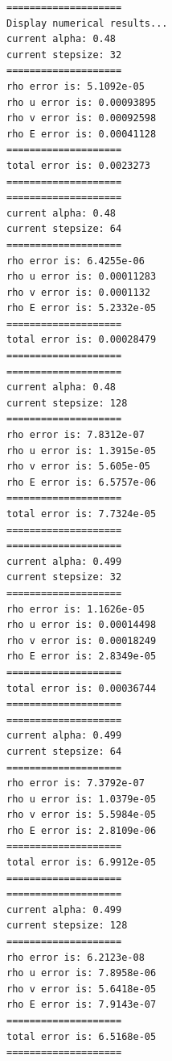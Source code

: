 \documentclass[12pt]{article}
\begin{document}
        \color{gray} 
\begin{verbatim}
====================
Display numerical results...
current alpha: 0.48
current stepsize: 32
====================
rho error is: 5.1092e-05
rho u error is: 0.00093895
rho v error is: 0.00092598
rho E error is: 0.00041128
====================
total error is: 0.0023273
====================
====================
current alpha: 0.48
current stepsize: 64
====================
rho error is: 6.4255e-06
rho u error is: 0.00011283
rho v error is: 0.0001132
rho E error is: 5.2332e-05
====================
total error is: 0.00028479
====================
====================
current alpha: 0.48
current stepsize: 128
====================
rho error is: 7.8312e-07
rho u error is: 1.3915e-05
rho v error is: 5.605e-05
rho E error is: 6.5757e-06
====================
total error is: 7.7324e-05
====================
====================
current alpha: 0.499
current stepsize: 32
====================
rho error is: 1.1626e-05
rho u error is: 0.00014498
rho v error is: 0.00018249
rho E error is: 2.8349e-05
====================
total error is: 0.00036744
====================
====================
current alpha: 0.499
current stepsize: 64
====================
rho error is: 7.3792e-07
rho u error is: 1.0379e-05
rho v error is: 5.5984e-05
rho E error is: 2.8109e-06
====================
total error is: 6.9912e-05
====================
====================
current alpha: 0.499
current stepsize: 128
====================
rho error is: 6.2123e-08
rho u error is: 7.8958e-06
rho v error is: 5.6418e-05
rho E error is: 7.9143e-07
====================
total error is: 6.5168e-05
====================
\end{verbatim} \color{black}

\end{document}
